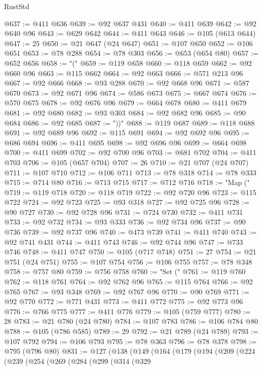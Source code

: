 \begin{lexlean}{RustStd}
\begin{coremodule}
@637 := @411 @636
@639 := @92 @637 @431
@640 := @411 @639
@642 := @92 @640 @96
@643 := @629 @642
@644 := @411 @643
@646 := @105 (@613 @644)
@647 := 25
@650 := @21 @647 (@24 @647)
@651 := @107 @650
@652 := @106 @651
@653 := @78 @288
@654 := @78 @303
@656 := @653 (@654 @80)
@657 := @652 @656
@658 := "("
@659 := @119 @658
@660 := @118 @659
@662 := @92 @660 @96
@663 := @115 @662
@664 := @92 @663
@666 := @571 @213 @96
@667 := @92 @666
@668 := @93 @288
@670 := @92 @668 @96
@671 := @587 @670
@673 := @92 @671 @96
@674 := @586 @673
@675 := @667 @674
@676 := @570 @675
@678 := @92 @676 @96
@679 := @664 @678
@680 := @411 @679
@681 := @92 @680
@682 := @93 @303
@684 := @92 @682 @96
@685 := @90 @684
@686 := @92 @685
@687 := "))"
@688 := @119 @687
@689 := @118 @688
@691 := @92 @689 @96
@692 := @115 @691
@694 := @92 @692 @96
@695 := @686 @694
@696 := @411 @695
@698 := @92 @696 @96
@699 := @664 @698
@700 := @411 @699
@702 := @92 @700 @96
@703 := @681 @702
@704 := @411 @703
@706 := @105 (@657 @704)
@707 := 26
@710 := @21 @707 (@24 @707)
@711 := @107 @710
@712 := @106 @711
@713 := @78 @318
@714 := @78 @333
@715 := @714 @80
@716 := @713 @715
@717 := @712 @716
@718 := "Map ("
@719 := @119 @718
@720 := @118 @719
@722 := @92 @720 @96
@723 := @115 @722
@724 := @92 @723
@725 := @93 @318
@727 := @92 @725 @96
@728 := @90 @727
@730 := @92 @728 @96
@731 := @724 @730
@732 := @411 @731
@733 := @92 @732
@734 := @93 @333
@736 := @92 @734 @96
@737 := @90 @736
@739 := @92 @737 @96
@740 := @473 @739
@741 := @411 @740
@743 := @92 @741 @431
@744 := @411 @743
@746 := @92 @744 @96
@747 := @733 @746
@748 := @411 @747
@750 := @105 (@717 @748)
@751 := 27
@754 := @21 @751 (@24 @751)
@755 := @107 @754
@756 := @106 @755
@757 := @78 @348
@758 := @757 @80
@759 := @756 @758
@760 := "Set ("
@761 := @119 @760
@762 := @118 @761
@764 := @92 @762 @96
@765 := @115 @764
@766 := @92 @765
@767 := @93 @348
@769 := @92 @767 @96
@770 := @90 @769
@771 := @92 @770
@772 := @771 @431
@773 := @411 @772
@775 := @92 @773 @96
@776 := @766 @775
@777 := @411 @776
@779 := @105 (@759 @777)
@780 := 28
@783 := @21 @780 (@24 @780)
@784 := @107 @783
@786 := @106 @784 @80
@788 := @105 (@786 @585)
@789 := 29
@792 := @21 @789 (@24 @789)
@793 := @107 @792
@794 := @106 @793
@795 := @78 @363
@796 := @78 @378
@798 := @795 (@796 @80)
@831 := @127
    (@138
      (@149
        (@164
          (@179
            (@194
              (@209
                (@224
                  (@239
                    (@254
                      (@269
                        (@284
                          (@299
                            (@314
                              (@329

\end{coremodule}
\end{lexlean}
